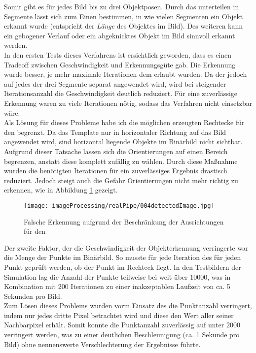 Somit gibt es für jedes Bild bis zu drei Objektposen. Durch das unterteilen in Segmente lässt sich zum Einen bestimmen, in wie vielen Segmenten ein Objekt erkannt wurde (entspricht der \textit{Länge} des Objektes im Bild). Des weiteren kann ein gebogener Verlauf oder ein abgeknicktes Objekt im Bild sinnvoll erkannt werden.\\
In den ersten Tests dieses Verfahrens ist ersichtlich geworden, dass es einen Tradeoff zwischen Geschwindigkeit und Erkennungsgüte gab. Die Erkennung wurde besser, je mehr maximale Iterationen dem \rans erlaubt wurden. Da der \rans jedoch auf jedes der drei Segmente separat angewendet wird, wird bei steigender Iterationsanzahl die Geschwindigkeit deutlich reduziert. Für eine zuverlässige Erkennung waren zu viele Iterationen nötig, sodass das Verfahren nicht einsetzbar wäre.\\
Als Lösung für dieses Probleme habe ich die möglichen erzeugten Rechtecke für den \rans begrenzt. Da das Template nur in horizontaler Richtung auf das Bild angewendet wird, sind horizontal liegende Objekte im Binärbild nicht sichtbar. Aufgrund dieser Tatsache lassen sich die Orientierungen auf einen Bereich begrenzen, anstatt diese komplett zufällig zu wählen. Durch diese Maßnahme wurden die benötigten Iterationen für ein zuverlässiges Ergebnis drastisch reduziert. Jedoch steigt auch die Gefahr Orientierungen nicht mehr richtig zu erkennen, wie in Abbildung \ref{detecFail} gezeigt.\\
\begin{figure}[H]
\centering
\texttt{[image: imageProcessing/realPipe/004detectedImage.jpg]}
\caption{Falsche Erkennung aufgrund der Beschränkung der Ausrichtungen für den \rans}
\label{detecFail}
\end{figure}
Der zweite Faktor, der die Geschwindigkeit der Objekterkennung verringerte war die Menge der Punkte im Binärbild. So musste für jede Iteration des \rans für jeden Punkt geprüft werden, ob der Punkt im Rechteck liegt. In den Testbildern der Simulation lag die Anzahl der Punkte teilweise bei weit über $10000$, was in Kombination mit $200$ Iterationen zu einer inakzeptablen Laufzeit von ca. 5 Sekunden pro Bild.\\
Zum Lösen dieses Problems wurden vorm Einsatz des \rans die Punktanzahl verringert, indem nur jedes dritte Pixel betrachtet wird und diese den Wert aller seiner Nachbarpixel erhält.  Somit konnte die Punktanzahl zuverlässig auf unter $2000$ verringert werden, was zu einer deutlichen Beschleunigung (ca. 1 Sekunde pro Bild) ohne nennenswerte Verschlechterung der Ergebnisse führte.
